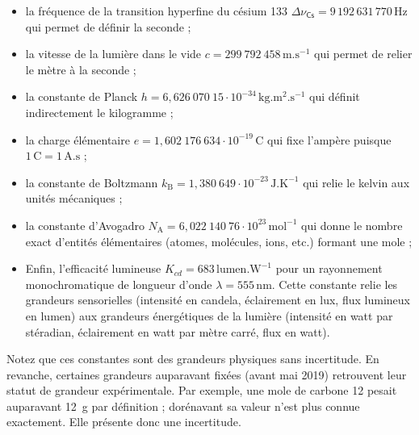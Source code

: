 \begin{itemize}
\item la fréquence de la transition hyperfine du césium 133 \(\Delta \nu_\textsf{Cs}=9\,192\,631\,770\,\mathrm{Hz}\) qui permet de définir la seconde ;
\item la vitesse de la lumière dans le vide \(c=299~792~458\,\mathrm{m.s^{-1}}\) qui permet de relier le mètre à la seconde ;
\item la constante de Planck \(h=6{,}626~070~15\cdot 10^{-34}\,\mathrm{kg.m^2.s^{-1}}\) qui définit indirectement le kilogramme ;
\item la charge élémentaire \(e=1{,}602~176~634\cdot 10^{-19}\,\mathrm{C}\) qui fixe l'ampère puisque \(1\,\mathrm{C}=1\,\mathrm{A.s}\) ;
\item la constante de Boltzmann \(k_\text{B}=1{,}380~649 \cdot 10^{-23} \, \mathrm{J.K^{-1} } \) qui relie le kelvin aux unités mécaniques ;
\item la constante d'Avogadro \(N_\text{A}=6{,}022~140~76\cdot 10^{23}\,\mathrm{mol^{-1}}\) qui donne le nombre exact d'entités élémentaires (atomes, molécules, ions, etc.) formant une mole ;
\item Enfin, l'efficacité lumineuse \(K_{cd}=683\,\mathrm{lumen.W^{-1}}\) pour un rayonnement monochromatique de longueur d'onde \(\lambda=555\,\mathrm{nm}\). Cette constante relie les grandeurs sensorielles (intensité en candela, éclairement en lux, flux lumineux en lumen) aux grandeurs énergétiques de la lumière (intensité en watt par stéradian, éclairement en watt par mètre carré, flux en watt).
\end{itemize}
Notez que ces constantes sont des grandeurs physiques sans incertitude. En revanche, certaines grandeurs auparavant fixées (avant mai 2019) retrouvent leur statut de grandeur expérimentale. Par exemple, une mole de carbone 12 pesait auparavant 12~g par définition ; dorénavant sa valeur n'est plus connue exactement. Elle présente donc une incertitude.



